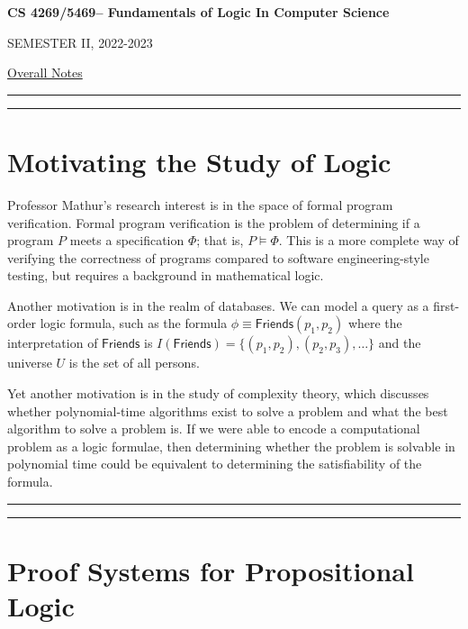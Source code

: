 \documentclass[11pt,usenames, dvipsnames]{article}
\newcommand{\masunitnumber}{CS 4269/5469}
\newcommand{\academicyear}{2022-2023}
\newcommand{\semester}{II}
\newcommand{\coursename}{Fundamentals of Logic In Computer Science}
\begin{document}
\setlength{\headsep}{5truemm}
\setlength{\headheight}{14.5truemm}
\setlength{\voffset}{-0.45truein}
\renewcommand{\headrulewidth}{0.0pt}

\begin{center}
{\Large \bf \masunitnumber -- \coursename}
\end{center}

\begin{center}
SEMESTER \semester, \academicyear
\end{center}

\begin{center}
\underline{Overall Notes}\\
\end{center}

\vspace{5truemm}
\hrule
\hrule

\section*{\large \centering Motivating the Study of Logic}
\noindent

Professor Mathur's research interest is in the space of formal program verification. Formal program verification is the problem of determining if a program $P$ meets a specification $\Phi$; that is, $P \models \Phi$. This is a more complete way of verifying the correctness of programs compared to software engineering-style testing, but requires a background in mathematical logic.

Another motivation is in the realm of databases. We can model a query as a first-order logic formula, such as the formula $\phi \equiv \mathsf{Friends}(p_1, p_2)$ where the interpretation of $\mathsf{Friends}$ is $I(\mathsf{Friends}) = \{(p_1, p_2), (p_2, p_3), \ldots \}$ and the universe $U$ is the set of all persons.

Yet another motivation is in the study of complexity theory, which discusses whether polynomial-time algorithms exist to solve a problem and what the best algorithm to solve a problem is. If we were able to encode a computational problem as a logic formulae, then determining whether the problem is solvable in polynomial time could be equivalent to determining the satisfiability of the formula.

\vspace{5truemm}
\hrule
\hrule

\section*{\large \centering Proof Systems for Propositional Logic}
\noindent
\end{document}
